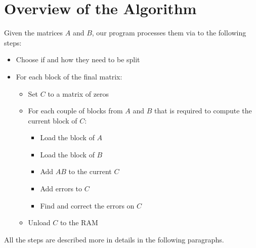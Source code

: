 \section{Overview of the Algorithm}
\label{sec:overview}

Given the matrices $A$ and $B$, our program processes them via to the following steps:
\begin{itemize}
	\itemsep 0em
	\item Choose if and how they need to be split
	\item For each block of the final matrix:
	      \begin{itemize}[topsep=0pt]
		      \itemsep 0em
		      \item Set $C$ to a matrix of zeros
		      \item For each couple of blocks from $A$ and $B$ that is required to compute the current block of $C$:
		            \begin{itemize}[topsep=0pt]
			            \itemsep 0em
			            \item Load the block of $A$
			            \item Load the block of $B$
			            \item Add $AB$ to the current $C$
			            \item Add errors to $C$
			            \item Find and correct the errors on $C$
		            \end{itemize}
		      \item Unload $C$ to the RAM
	      \end{itemize}
\end{itemize}

All the steps are described more in details in the following paragraphs.
